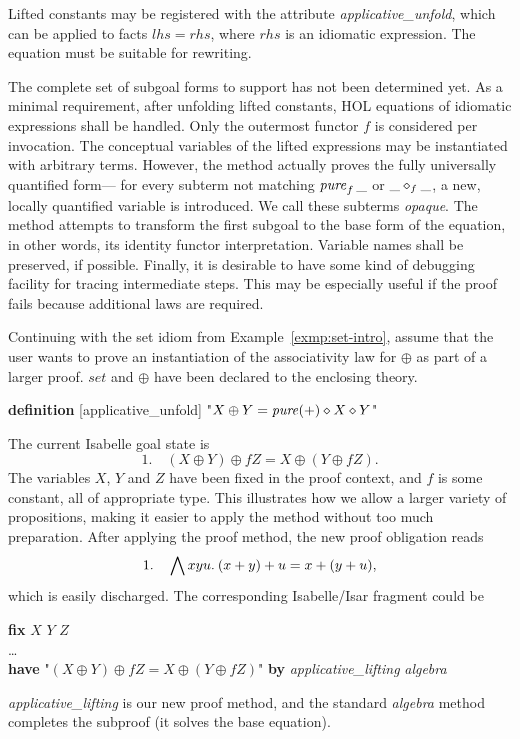 Lifted constants may be registered with the attribute \emph{applicative\_unfold},
which can be applied to facts $\mathit{lhs} = \mathit{rhs}$, where $\mathit{rhs}$
is an idiomatic expression.
The equation must be suitable for rewriting.

The complete set of subgoal forms to support has not been determined yet.
\todo{}
As a minimal requirement, after unfolding lifted constants, HOL equations of
idiomatic expressions shall be handled.
Only the outermost functor $f$ is considered per invocation.
The conceptual variables of the lifted expressions may be instantiated with
arbitrary terms.
However, the method actually proves the fully universally quantified form---%
for every subterm not matching $\operatorname{\mathit{pure}}_f{\_}$ or $\_ \diamond_f \_$, a new, locally
quantified variable is introduced.
We call these subterms \emph{opaque}.
The method attempts to transform the first subgoal to the base form of the
equation, in other words, its identity functor interpretation.
Variable names shall be preserved, if possible.
Finally, it is desirable to have some kind of debugging facility for tracing
intermediate steps.
This may be especially useful if the proof fails because additional laws are
required.

\begin{example}\label{exmp:set-usage}
Continuing with the set idiom from Example~\ref{exmp:set-intro}, assume that
the user wants to prove an instantiation of the associativity law for $\oplus$
as part of a larger proof.
$\mathit{set}$ and $\oplus$ have been declared to the enclosing theory.
\begin{isabelle}
	\textbf{definition} [applicative\_unfold] "$X \oplus Y = \operatorname{\mathit{pure}} (+) \diamond X \diamond Y$"
\end{isabelle}
The current Isabelle goal state is
\[ 1. \quad (X \oplus Y) \oplus f Z = X \oplus (Y \oplus f Z). \]
The variables $X$, $Y$ and $Z$ have been fixed in the proof context, and $f$ is
some constant, all of appropriate type.
This illustrates how we allow a larger variety of propositions, making it
easier to apply the method without too much preparation.
After applying the proof method, the new proof obligation reads
\[ 1. \quad \bigwedge x y u.\>(x + y) + u = x + (y + u), \]
which is easily discharged.
The corresponding Isabelle/Isar fragment could be
\begin{isabelle}
	\textbf{fix} $X$ $Y$ $Z$ \\
	\dots \\
	\textbf{have} "$(X \oplus Y) \oplus f Z = X \oplus (Y \oplus f Z)$"
		\textbf{by} \textit{applicative\_lifting} \textit{algebra}
\end{isabelle}
\textit{applicative\_lifting} is our new proof method, and the standard
\textit{algebra} method completes the subproof (it solves the base equation).
\end{example}


